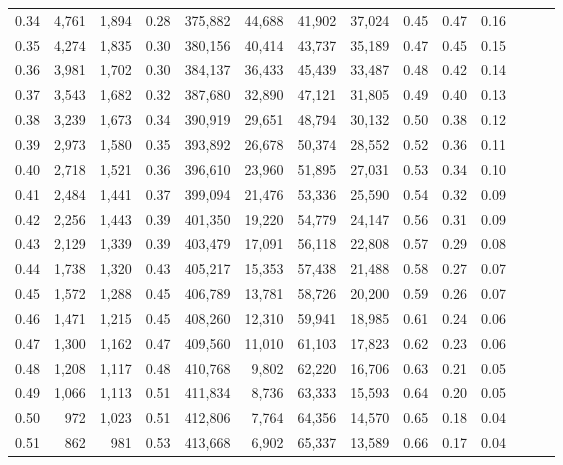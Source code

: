 \begin{tabular}{rrrrrrrrrrrrrr}
0.34 &   4,761 &  1,894 &  0.28 &  375,882 &   44,688 &  41,902 &  37,024 &  0.45 &  0.47 &      0.16 \\
0.35 &   4,274 &  1,835 &  0.30 &  380,156 &   40,414 &  43,737 &  35,189 &  0.47 &  0.45 &      0.15 \\
0.36 &   3,981 &  1,702 &  0.30 &  384,137 &   36,433 &  45,439 &  33,487 &  0.48 &  0.42 &      0.14 \\
0.37 &   3,543 &  1,682 &  0.32 &  387,680 &   32,890 &  47,121 &  31,805 &  0.49 &  0.40 &      0.13 \\
0.38 &   3,239 &  1,673 &  0.34 &  390,919 &   29,651 &  48,794 &  30,132 &  0.50 &  0.38 &      0.12 \\
0.39 &   2,973 &  1,580 &  0.35 &  393,892 &   26,678 &  50,374 &  28,552 &  0.52 &  0.36 &      0.11 \\
0.40 &   2,718 &  1,521 &  0.36 &  396,610 &   23,960 &  51,895 &  27,031 &  0.53 &  0.34 &      0.10 \\
0.41 &   2,484 &  1,441 &  0.37 &  399,094 &   21,476 &  53,336 &  25,590 &  0.54 &  0.32 &      0.09 \\
0.42 &   2,256 &  1,443 &  0.39 &  401,350 &   19,220 &  54,779 &  24,147 &  0.56 &  0.31 &      0.09 \\
0.43 &   2,129 &  1,339 &  0.39 &  403,479 &   17,091 &  56,118 &  22,808 &  0.57 &  0.29 &      0.08 \\
0.44 &   1,738 &  1,320 &  0.43 &  405,217 &   15,353 &  57,438 &  21,488 &  0.58 &  0.27 &      0.07 \\
0.45 &   1,572 &  1,288 &  0.45 &  406,789 &   13,781 &  58,726 &  20,200 &  0.59 &  0.26 &      0.07 \\
0.46 &   1,471 &  1,215 &  0.45 &  408,260 &   12,310 &  59,941 &  18,985 &  0.61 &  0.24 &      0.06 \\
0.47 &   1,300 &  1,162 &  0.47 &  409,560 &   11,010 &  61,103 &  17,823 &  0.62 &  0.23 &      0.06 \\
0.48 &   1,208 &  1,117 &  0.48 &  410,768 &    9,802 &  62,220 &  16,706 &  0.63 &  0.21 &      0.05 \\
0.49 &   1,066 &  1,113 &  0.51 &  411,834 &    8,736 &  63,333 &  15,593 &  0.64 &  0.20 &      0.05 \\
0.50 &     972 &  1,023 &  0.51 &  412,806 &    7,764 &  64,356 &  14,570 &  0.65 &  0.18 &      0.04 \\
0.51 &     862 &    981 &  0.53 &  413,668 &    6,902 &  65,337 &  13,589 &  0.66 &  0.17 &      0.04 \\

\end{tabular}
